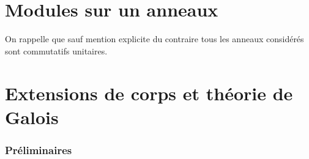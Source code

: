 \documentclass[a4paper, oneside, 12pt]{book}
\begin{document}
\part{Modules sur un anneaux}

On rappelle que sauf mention explicite du contraire tous les anneaux considérés
sont commutatifs unitaires.







\part{Extensions de corps et théorie de Galois}

\section*{Préliminaires}
\end{document}
